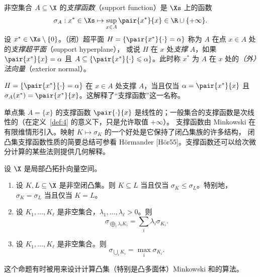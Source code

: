 \begin{definition}
\label{def:9}
非空集合 $A\subseteq\X$ 的\emph{支撑函数}（support function）是 $\Xs$ 上的函数
\begin{equation}
  \label{eq:3}
  \sigma_A:x^*\in\Xs\mapsto\sup_{x\in A}\pair{x^*}{x}\in\R\cup\{+\infty\}.
\end{equation}
设 $x^*\in\Xs\setminus\{0\}$。（闭）超平面 $H=\{\pair{x^*}{\cdot}=\alpha\}$ 称为 $A$ 在点 $x\in A$ 处的\emph{支撑超平面}（support hyperplane），
或说 $H$ 在 $x$ 处\emph{支撑} $A$，如果 $\pair{x^*}{x}=\alpha$ 且 $A\subseteq\{\pair{x^*}{\cdot}\leqslant\alpha\}$。此时称 $x^*$ 为 $A$ 在 $x$ 处的\emph{（外）法向量}（exterior normal）。
\end{definition}

\begin{remark}
\label{rem:2}
$H=\{\pair{x^*}{\cdot}=\alpha\}$ 在 $x\in A$ 处支撑 $A$，当且仅当 $\alpha=\pair{x^*}{x}$ 且 $\sigma_A(x^*)=\pair{x^*}{x}$。这解释了“支撑函数”这一名称。
\end{remark}

单点集 $A=\{x\}$ 的支撑函数 $\pair{\cdot}{x}$ 是线性的；一般集合的支撑函数是次线性的（在定义~\ref{def:4} 的意义下，只是允许取值 $+\infty$）。
支撑函数由 Minkowski 在有限维情形引入。映射 $K\mapsto\sigma_K$ 的一个好处是它保持了闭凸集族的许多结构，
闭凸集支撑函数性质的简要总结可参看 Hörmander [Hör55]。支撑函数还可以给次微分计算的某些法则提供几何解释。

\begin{proposition}
\label{res:13}
设 $\X$ 是局部凸拓扑向量空间。
\begin{enumerate}[label=(\roman*)]
  \item 设 $K,L\subseteq\X$ 是非空闭凸集。则 $K\subseteq L$ 当且仅当 $\sigma_K\leqslant\sigma_L$。特别地，$\sigma_K=\sigma_L$ 当且仅当 $K=L$。
  \item 设 $K_1,\dots,K_\ell$ 是非空集合，$\lambda_1,\dots,\lambda_\ell>0$。则
  \[
    \sigma_{\bigoplus_i\lambda_iK_i}=\sum_i\lambda_i\sigma_{K_i}.
  \]
  \item 设 $K_1,\dots,K_\ell$ 是非空集合。则
  \[
    \sigma_{\bigcup_iK_i}=\max_i\sigma_{K_i}.
  \]
\end{enumerate}
\end{proposition}

\begin{remark}
\label{rem:3}
这个命题有时被用来设计计算凸集（特别是凸多面体）Minkowski 和的算法。
\end{remark}

